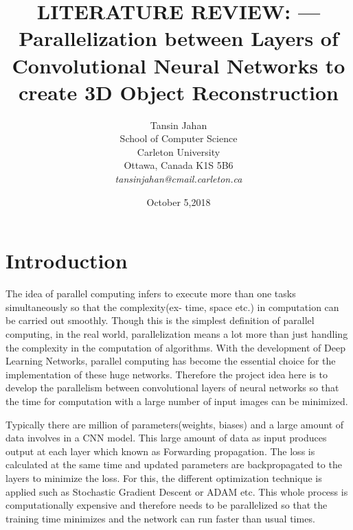 \documentclass[11pt]{article}       %
\begin{document}


\title{LITERATURE REVIEW: --- Parallelization between Layers of Convolutional Neural Networks to create 3D Object Reconstruction}


\author{
Tansin Jahan\\
School of Computer Science\\
Carleton University\\
Ottawa, Canada K1S 5B6\\
{\em tansinjahan@cmail.carleton.ca}
} %
\date{October 5,2018}
\maketitle



\section{Introduction} \label{intro}

The idea of parallel computing infers to execute more than one tasks simultaneously so that the complexity(ex- time, space etc.) in computation can be carried out smoothly. Though this is the simplest definition of parallel computing, in the real world, parallelization means a lot more than just handling the complexity in the computation of algorithms. With the development of Deep Learning Networks, parallel computing has become the essential choice for the implementation of these huge networks. Therefore the project idea here is to develop the parallelism between convolutional layers of neural networks so that the time for computation with a large number of input images can be minimized.

Typically there are million of parameters(weights, biases) and a large amount of data involves in a CNN model. This large amount of data as input produces output at each layer which known as Forwarding propagation. The loss is calculated at the same time and updated parameters are backpropagated to the layers to minimize the loss. For this, the different optimization technique is applied such as Stochastic Gradient Descent or ADAM etc. This whole process is computationally expensive and therefore needs to be parallelized so that the training time minimizes and the network can run faster than usual times. 
\end{document}
